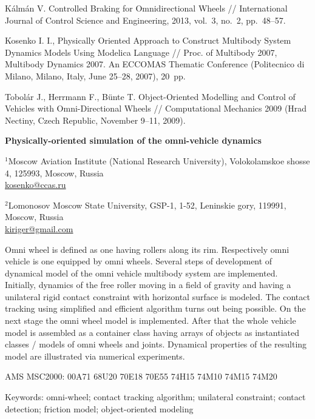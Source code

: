 \documentclass[12pt,a4paper]{article}
\newcommand{\MSCindex}[1]{\noindent AMS MSC2000: \smallskip #1\par\smallskip }
\begin{document}
\begin{thebibliography}{99}
K\'alm\'an V. Controlled Braking for Omnidirectional Wheels // International 
Journal of Control Science and Engineering, 2013, vol.~3, no.~2, pp.~48--57.

Kosenko I. I., Physically Oriented Approach to Construct Multibody System 
Dynamics Models Using Modelica Language // Proc. of Multibody 2007, Multibody 
Dynamics 2007. An ECCOMAS Thematic Conference (Politecnico di Milano, Milano, 
Italy, June 25--28, 2007), 20~pp.

Tobol\'ar J., Herrmann F., B\"unte T. Object-Oriented Modelling and Control 
of Vehicles with Omni-Directional Wheels // Computational Mechanics 2009 (Hrad 
Nectiny, Czech Republic, November 9--11, 2009).

\end{thebibliography}

\newpage

\English

{\noindent\bf Physically-oriented simulation of the omni-vehicle dynamics}

\smallskip

\small
{}

\smallskip

\noindent ${}^1$Moscow Aviation Institute (National Research University),
Volokolamskoe shosse 4, 125993, Moscow, Russia\\
\noindent\url{kosenko@ccas.ru}

\noindent ${}^2$Lomonosov Moscow State University, 
GSP-1, 1-52, Leninskie gory, 119991, Moscow, Russia\\
\noindent\url{kiriger@gmail.com}

\smallskip
         
\normalsize

\noindent
Omni wheel is defined as one having rollers along its rim. Respectively omni 
vehicle is one equipped by omni wheels. Several steps of development of 
dynamical model of the omni vehicle multibody system are implemented. 
Initially, dynamics of the free roller moving in a field of gravity and having 
a unilateral rigid contact constraint with horizontal surface is modeled. The 
contact tracking using simplified and efficient algorithm turns out being 
possible. On the next stage the omni wheel model is implemented. After that the 
whole vehicle model is assembled as a container class having arrays of objects 
as instantiated classes / models of omni wheels and joints. Dynamical 
properties of the resulting model are illustrated via numerical experiments.

\smallskip

\noindent
\MSCindex{00A71 68U20 70E18 70E55 74H15 74M10 74M15 74M20} 
\noindent 
Keywords: omni-wheel; contact tracking algorithm; unilateral constraint; 
contact detection; friction model; object-oriented modeling 
\end{document}
